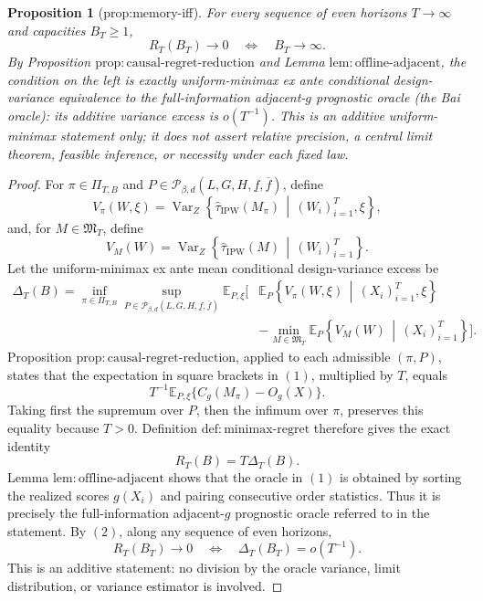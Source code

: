 \documentclass{article}
\newtheorem{proposition}{Proposition}
\begin{document}
\begin{proposition}[prop:memory-iff]\label{prop:memory-iff}
For every sequence of even horizons \(T\to\infty\) and capacities \(B_T\ge 1\),
\[
R_T(B_T)\to 0\quad\Longleftrightarrow\quad B_T\to\infty.
\]
By Proposition \(\mathrm{prop:causal\text{-}regret\text{-}reduction}\) and Lemma \(\mathrm{lem:offline\text{-}adjacent}\), the condition on the left is exactly uniform-minimax ex ante conditional design-variance equivalence to the full-information adjacent-\(g\) prognostic oracle (the Bai oracle): its additive variance excess is \(o(T^{-1})\). This is an additive uniform-minimax statement only; it does not assert relative precision, a central limit theorem, feasible inference, or necessity under each fixed law.
\end{proposition}
\begin{proof}
For \(\pi\in\Pi_{T,B}\) and \(P\in\mathcal P_{\beta,d}(L,G,H,\underline f,\overline f)\), define
\[
V_\pi(W,\xi)
=\operatorname{Var}_Z\!\left\{
\widehat\tau_{\mathrm{IPW}}(M_\pi)
\,\middle|\,(W_i)_{i=1}^T,\xi
\right\},
\]
and, for \(M\in\mathfrak M_T\), define
\[
V_M(W)
=\operatorname{Var}_Z\!\left\{
\widehat\tau_{\mathrm{IPW}}(M)
\,\middle|\,(W_i)_{i=1}^T
\right\}.
\]
Let the uniform-minimax ex ante mean conditional design-variance excess be
\[
\begin{split}
\Delta_T(B)
=\inf_{\pi\in\Pi_{T,B}}
\sup_{P\in\mathcal P_{\beta,d}(L,G,H,\underline f,\overline f)}
\mathbb E_{P,\xi}\!\Bigg[&
\mathbb E_P\!\left\{V_\pi(W,\xi)\,\middle|\,(X_i)_{i=1}^T,\xi\right\}\\
&-\min_{M\in\mathfrak M_T}
\mathbb E_P\!\left\{V_M(W)\,\middle|\,(X_i)_{i=1}^T\right\}
\Bigg].
\end{split}
\tag{1}
\]
Proposition \(\mathrm{prop:causal\text{-}regret\text{-}reduction}\), applied to each admissible \((\pi,P)\), states that the expectation in square brackets in \((1)\), multiplied by \(T\), equals
\[
T^{-1}\mathbb E_{P,\xi}\{C_g(M_\pi)-O_g(X)\}.
\]
Taking first the supremum over \(P\), then the infimum over \(\pi\), preserves this equality because \(T>0\).  Definition \(\mathrm{def:minimax\text{-}regret}\) therefore gives the exact identity
\[
R_T(B)=T\Delta_T(B).
\tag{2}
\]
Lemma \(\mathrm{lem:offline\text{-}adjacent}\) shows that the oracle in \((1)\) is obtained by sorting the realized scores \(g(X_i)\) and pairing consecutive order statistics.  Thus it is precisely the full-information adjacent-\(g\) prognostic oracle referred to in the statement.  By \((2)\), along any sequence of even horizons,
\[
R_T(B_T)\longrightarrow0
\quad\Longleftrightarrow\quad
\Delta_T(B_T)=o(T^{-1}).
\tag{3}
\]
This is an additive statement: no division by the oracle variance, limit distribution, or variance estimator is involved.


\end{proof}
\end{document}
